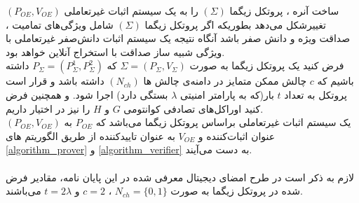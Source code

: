 ساخت آنره ، پروتکل زیگما 
$(\Sigma)$
را به یک سیستم اثبات غیرتعاملی 
$(P_{OE}, V_{OE})$
تغییر‌شکل می‌دهد بطوریکه اگر پروتکل زیگما
$(\Sigma)$
شامل ویژگی‌های تمامیت ، صداقت ویژه و دانش صفر باشد آنگاه نتیجه یک سیستم اثبات دانش‌صفر  غیرتعاملی با ویژگی  شبیه ‌ساز صداقت با استخراج آنلاین خواهد بود.
\\
 فرض کنید یک پروتکل زیگما به صورت 
$\Sigma = (P_\Sigma , V_\Sigma)$
که
$P_\Sigma = (P_\Sigma^1 , P_\Sigma^2)$
داشته باشیم که 
$c$
 چالش ممکن متمایز در دامنه‌ی چالش ها 
$(N_{ch})$
داشته باشد و ‌قرار است  پروتکل به تعداد 
$t$
بار(که به پارامتر امنیتی
$\lambda$
بستگی دارد) اجرا شود. و همچنین فرض کنید اوراکل‌های تصادفی کوانتومی
$G$
و
$H$
را نیز در اختیار داریم. 
\\ 
$(P_{OE} , V_{OE})$
یک سیستم اثبات غیرتعاملی براساس پروتکل زیگما می‌باشد که 
$P_{OE}$
به عنوان اثبات‌کننده و 
$V_{OE}$
به عنوان تاییدکننده از طریق الگوریتم های 
\ref{algorithm_prover}
 و 
\ref{algorithm_verifier} 
 به دست می‌آیند.
\\
\\
لازم به ذکر است  در طرح امضای دیجیتال معرفی شده در این پایان نامه، مقادیر فرض شده در پروتکل زیگما  به صورت
$N_{ch} = \{0,1\}$
،
$c = 2$ 
 و
$t = 2\lambda $ 
می‌باشند.
\\
\\
